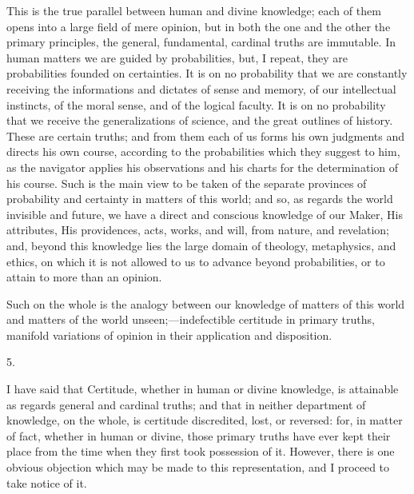 This is the true parallel between human and divine knowledge; each
of them opens into a large field of mere opinion, but in both the one
and the other the primary principles, the general, fundamental,
cardinal truths are immutable. In human matters we are guided by
probabilities, but, I repeat, they are probabilities founded on
certainties. It is on no probability that we are constantly receiving
the informations and dictates of sense and memory, of our intellectual
instincts, of the moral sense, and of the logical faculty. It is on no
probability that we receive the generalizations of science, and the
great outlines of history. These are certain truths; and from them
each of us forms his own judgments and directs his own course,
according to the probabilities which they suggest to him, as the
navigator applies his observations and his charts for the
determination of his course. Such is the main view to be taken of the
separate provinces of probability and certainty in matters of this
world; and so, as regards the world invisible and future, we have a
direct and conscious knowledge of our Maker, His attributes, His
providences, acts, works, and will, from nature, and revelation; and,
beyond this knowledge lies the large domain of theology, metaphysics,
and ethics, on which it is not allowed to us to advance beyond
probabilities, or to attain to more than an opinion.

Such on the whole is the analogy between our knowledge of matters
of this world and matters of the world unseen;—indefectible
certitude in primary truths, manifold variations of opinion in their
application and disposition.

5.

I have said that Certitude, whether in human or divine knowledge,
is attainable as regards general and cardinal truths; and that in
neither department of knowledge, on the whole, is certitude
discredited, lost, or reversed: for, in matter of fact, whether in
human or divine, those primary truths have ever kept their place from
the time when they first took possession of it. However, there is one
obvious objection which may be made to this representation, and I
proceed to take notice of it.

